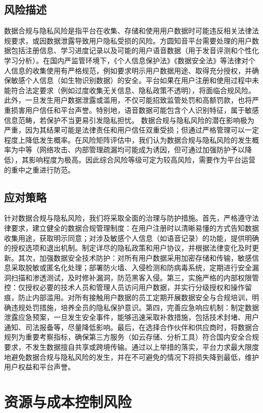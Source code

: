 \subsection{风险描述}
数据合规与隐私风险是指平台在收集、存储和使用用户数据时可能违反相关法律法规要求，或因数据泄露导致用户隐私受损的风险。方圆知音平台需要处理的用户数据包括注册信息、学习进度记录以及可能的用户语音数据（用于发音评测和个性化学习分析）。在国内严监管环境下，《个人信息保护法》《数据安全法》等法律对个人信息的收集使用有严格规范，例如要求明示用户数据用途、取得充分授权，并确保敏感个人信息（如生物识别数据）的安全。平台如果在用户注册和使用过程中未能符合法定要求（例如过度收集无关信息、隐私政策不透明），将面临合规风险。此外，一旦发生用户数据泄露或滥用，不仅可能招致监管处罚和高额罚款，也将严重损害用户信任和平台声誉。特别地，语音数据可能包含个人识别特征，属于敏感信息范畴，若保护不当更易引发隐私担忧。
数据合规与隐私风险的潜在影响极为严重，因为其结果可能是法律责任和用户信任双重受损；但通过严格管理可以一定程度上降低发生概率。在风险矩阵评估中，我们认为数据合规与隐私风险的发生概率为中等（网络攻击、内部管理疏漏均可能成为诱因，但可通过加强防护予以降低），其影响程度为极高。因此综合风险等级可定为较高风险，需要作为平台运营的重中之重进行防范。
\subsection{应对策略}
针对数据合规与隐私风险，我们将采取全面的治理与防护措施。首先，严格遵守法律要求，建立健全的数据合规管理制度：在用户注册时以清晰易懂的方式告知数据收集用途，获取明示同意；对涉及敏感个人信息（如语音记录）的功能，提供明确的授权选项和退出机制。制定详尽的隐私政策和用户协议，并根据法律变化及时更新。其次，加强数据安全技术防护：对所有用户数据采用加密存储和传输，敏感信息采取脱敏或匿名化处理；部署防火墙、入侵检测和防病毒系统，定期进行安全漏洞扫描和渗透测试，及时修补漏洞，防范黑客入侵。第三，实施严格的内部权限管控：仅授权必要的技术人员和管理人员访问用户数据，并实行分级授权和操作留痕，防止内部滥用。对所有接触用户数据的员工定期开展数据安全与合规培训，明确违规处罚措施，培养全员的隐私保护意识。第四，完善应急响应机制：制定数据泄露应急预案，一旦发生安全事件，能够迅速采取补救措施，包括技术封堵、用户通知、司法报备等，尽量降低影响。最后，在选择合作伙伴和供应商时，将数据合规列为重要考察指标，确保第三方服务（如云存储、分析工具）符合国内安全合规要求，不发生数据擅自共享或跨境传输。通过以上举措的落实，平台力求最大限度地避免数据合规与隐私风险的发生，并在不可避免的情况下将损失降到最低，维护用户权益和平台声誉。
\section{资源与成本控制风险}
